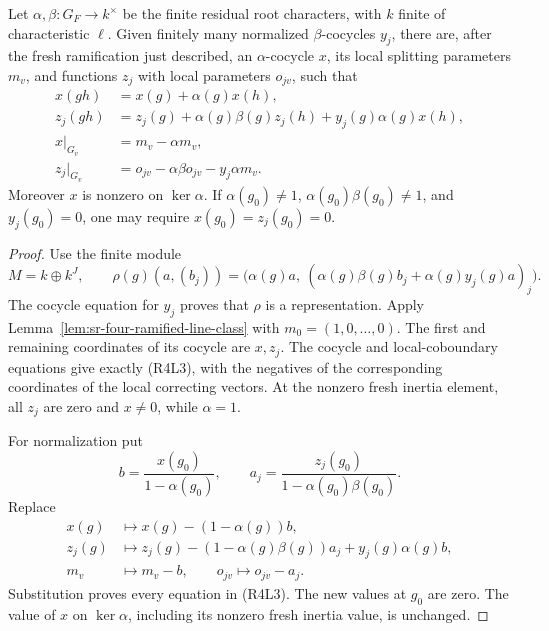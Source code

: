 \begin{srlemma}
\label{lem:sr-four-simultaneous-cup}
Let \(\alpha,\beta:G_F\to k^\times\) be the finite residual
root characters, with \(k\) finite of characteristic \(\ell\).
Given finitely many normalized \(\beta\)-cocycles \(y_j\),
there are, after the fresh ramification just described, an
\(\alpha\)-cocycle \(x\), its local splitting parameters \(m_v\),
and functions \(z_j\) with local parameters \(o_{jv}\), such that
\[
 \begin{split}
 x(gh)&=x(g)+\alpha(g)x(h),\\
 z_j(gh)&=z_j(g)+\alpha(g)\beta(g)z_j(h)
                         +y_j(g)\alpha(g)x(h),\\
 x|_{G_v}&=m_v-\alpha m_v,\\
 z_j|_{G_v}&=o_{jv}-\alpha\beta o_{jv}
                              -y_j\alpha m_v.
 \end{split}\tag{R4L3}
\]
Moreover \(x\) is nonzero on \(\ker\alpha\).
If \(\alpha(g_0)\ne1\), \(\alpha(g_0)\beta(g_0)\ne1\),
and \(y_j(g_0)=0\), one may require
\(x(g_0)=z_j(g_0)=0\).
\end{srlemma}
\begin{proof}
Use the finite module
\[
 M=k\oplus k^J,\qquad
 \rho(g)(a,(b_j))=
 \bigl(\alpha(g)a,\
       (\alpha(g)\beta(g)b_j+\alpha(g)y_j(g)a)_j\bigr).
\]
The cocycle equation for \(y_j\) proves that \(\rho\) is a
representation.
Apply Lemma~\ref{lem:sr-four-ramified-line-class} with
\(m_0=(1,0,\ldots,0)\).
The first and remaining coordinates of its cocycle are
\(x,z_j\). The cocycle and local-coboundary equations give
exactly (R4L3), with the negatives of the corresponding
coordinates of the local correcting vectors.
At the nonzero fresh inertia element, all \(z_j\) are zero
and \(x\ne0\), while \(\alpha=1\).

For normalization put
\[
 b=\frac{x(g_0)}{1-\alpha(g_0)},\qquad
 a_j=\frac{z_j(g_0)}{1-\alpha(g_0)\beta(g_0)}.
\]
Replace
\[
 \begin{split}
 x(g)&\longmapsto x(g)-(1-\alpha(g))b,\\
 z_j(g)&\longmapsto z_j(g)
        -(1-\alpha(g)\beta(g))a_j+y_j(g)\alpha(g)b,\\
 m_v&\longmapsto m_v-b,\qquad
 o_{jv}\longmapsto o_{jv}-a_j .
 \end{split}
\]
Substitution proves every equation in (R4L3).
The new values at \(g_0\) are zero.
The value of \(x\) on \(\ker\alpha\), including its nonzero
fresh inertia value, is unchanged.
\end{proof}


